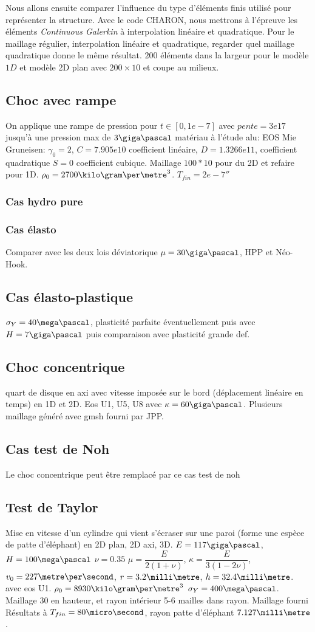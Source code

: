 \documentclass[10pt]{book}
\begin{document}
Nous allons ensuite comparer l'influence du type d'éléments finis utilisé pour représenter la structure. Avec le code CHARON, nous mettrons à l'épreuve les éléments \emph{Continuous Galerkin}  à  interpolation linéaire et quadratique. Pour le maillage régulier, interpolation  linéaire et quadratique, regarder quel maillage quadratique donne le même résultat. $200$ éléments dans la largeur pour le modèle $1D$ et modèle 2D plan avec $200 \times 10$ et coupe au milieux.

\subsection{Choc avec rampe}
On applique une rampe de pression pour $t \in [0, 1e-7]$ avec $pente = 3e17$ jusqu'à une pression max de $3\giga \pascal$ matériau à l'étude alu:
EOS Mie Gruneisen: 
$\gamma_{0}=2$, $C=7.905e10$ coefficient linéaire, $D = 1.3266e11$, coefficient quadratique $S=0$ coefficient cubique. Maillage $100*10$ pour du 2D et refaire pour 1D. $\rho_{0} = 2700\kilo\gram\per\metre^{3}$. $T_{fin}=2e-7\second$
\subsubsection{Cas hydro pure}
\subsubsection{Cas élasto}
 Comparer avec les deux lois déviatorique $\mu=30\giga\pascal$, HPP et Néo-Hook.
\subsection{Cas élasto-plastique}
$\sig_{Y}=40\mega\pascal$, plasticité parfaite éventuellement puis avec $H=7\giga\pascal$ puis comparaison avec plasticité grande def.
\subsection{Choc concentrique}
quart de disque en axi avec vitesse imposée sur le bord (déplacement linéaire en temps) en 1D et 2D. Eos U1, U5, U8 avec $\kappa= 60\giga\pascal$. Plusieurs maillage généré avec gmsh fourni par JPP.
\subsection{Cas test de Noh}
Le choc concentrique peut être remplacé par ce cas test de noh

\subsection{Test de Taylor}
Mise en vitesse d'un cylindre qui vient s'écraser sur une paroi (forme une espèce de patte d'éléphant) en 2D plan, 2D axi, 3D. $E=117\giga\pascal$, $H=100\mega\pascal$ $\nu=0.35$ $\mu = \dfrac{E}{2(1+\nu)}$, $\kappa = \dfrac{E}{3(1-2\nu)}$, $v_{0}=227\metre\per\second$, $r=3.2\milli\metre$, $h=32.4\milli\metre$. avec eos U1. $\rho_{0} = 8930\kilo\gram\per\metre^{3}$ $\sigma_{Y} = 400\mega\pascal$.  Maillage 30 en hauteur, et rayon intérieur 5-6 mailles dans rayon. Maillage fourni
Résultats à $T_{fin} =80\micro\second$, rayon patte d'éléphant $7.127\milli\metre$.
\end{document}
